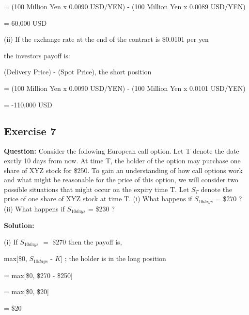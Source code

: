 \documentclass{article}
\begin{document}
\vspace{\baselineskip}

= (100 Million Yen x 0.0090 USD/YEN) - (100 Million Yen x 0.0089 USD/YEN)

\vspace{\baselineskip}

= 60,000 USD

(ii) If the exchange rate at the end of the contract is \$0.0101 per yen

the investors payoff is:

\vspace{\baselineskip}

(Delivery Price) - (Spot Price), the short position

\vspace{\baselineskip}

= (100 Million Yen x 0.0090 USD/YEN) - (100 Million Yen x 0.0101 USD/YEN)

\vspace{\baselineskip}

= -110,000 USD

\subsection*{Exercise 7}

\textbf{Question:} Consider the following European call option. Let T denote the date exctly 10
days from now. At time T, the holder of the option may purchase one share of XYZ stock for \$250. To gain an understanding of how call options work and what might be reasonable for the price of this option, we will consider two possible situations that might occur on the expiry time T. Let $S_T$ denote the price of one share of XYZ stock at time T. (i) What happens if $S_{10days}$ = \$270 ? (ii) What happens if $S_{10days}$ = \$230 ?

\textbf{Solution:}

(i)
If $S_{10 days}$ $=$ $\$270$ then the payoff is,
\vspace{\baselineskip}

max[\$0, $S_{10 days}$ - $K$] ; the holder is in the long position
\vspace{\baselineskip}

= max[\$0, \$270 - \$250]
\vspace{\baselineskip}

= max[\$0, \$20]
\vspace{\baselineskip}

= \$20
\end{document}

